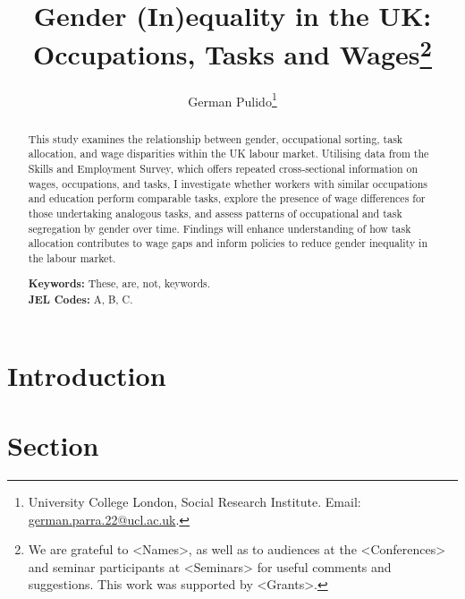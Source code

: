 \documentclass[12pt]{article}
\begin{document}
\title{Gender (In)equality in the UK: Occupations, Tasks and Wages\thanks{
We are grateful to <Names>, as well as to audiences at the <Conferences> and seminar participants at <Seminars> for useful comments and suggestions. 
This work was supported by <Grants>.
}}

\author{German Pulido\thanks{University College London, Social Research Institute. Email: \href{mailto:german.parra.22@ucl.ac.uk}{german.parra.22@ucl.ac.uk}.}}

\begin{titlepage}
\maketitle

\begin{abstract}
\noindent This study examines the relationship between gender, occupational sorting, task allocation, and wage disparities within the UK labour market. Utilising data from the Skills and Employment Survey, which offers repeated cross‐sectional information on wages, occupations, and tasks, I investigate whether workers with similar occupations and education perform comparable tasks, explore the presence of wage differences for those undertaking analogous tasks, and assess patterns of occupational and task segregation by gender over time. Findings will enhance understanding of how task allocation contributes to wage gaps and inform policies to reduce gender inequality in the labour market.

\vspace{1em}
\noindent\textbf{Keywords:} These, are, not, keywords.\\
\noindent\textbf{JEL Codes:} A, B, C.
\end{abstract}

\setcounter{page}{0}
\thispagestyle{empty}
\end{titlepage}

\pagebreak

\onehalfspacing %

\section{Introduction}\label{sec:introduction}


\section{Section} \label{sec:section}

\end{document}
